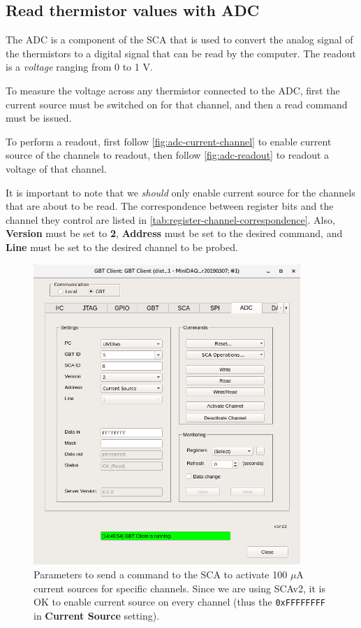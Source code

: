 \subsection{Read thermistor values with ADC}
The ADC is a component of the SCA that is used to convert the analog signal of
the thermistors to a digital signal that can be read by the computer.
The readout is a \emph{voltage} ranging from 0 to 1 V.

To measure the voltage across any thermistor connected to the ADC, first the
current source must be switched on for that channel, and then a read command
must be issued.

To perform a readout, first follow \autoref{fig:adc-current-channel} to enable
current source of the channels to readout,
then follow \autoref{fig:adc-readout} to readout a voltage of that channel.

It is important to note that we \emph{should} only enable current source for the
channels that are about to be read.
The correspondence between register bits and the channel they control are listed
in \autoref{tab:register-channel-correspondence}.
Also, \textbf{Version} must be set to \textbf{2}, \textbf{Address} must be set
to the desired command, and \textbf{Line} must be set to the desired channel to
be probed.

\begin{figure}[ht]
    \centering
    \includegraphics[width=0.9\textwidth]{res/gbt_client_adc_readout_currentsource.png}
    \caption{
        Parameters to send a command to the SCA to activate 100 $\mu$A current
        sources for specific channels.
        Since we are using SCAv2, it is OK to enable current source on every
        channel (thus the \texttt{0xFFFFFFFF} in \textbf{Current Source}
        setting).
    }
    \label{fig:adc-current-channel}
\end{figure}

